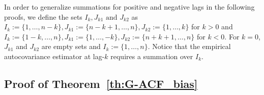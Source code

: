 \documentclass[11pt]{article}
\theoremstyle{remark}
\begin{document}
In order to generalize summations for positive and negative lags in the following proofs, we define the sets $I_k, J_{k1} \text{ and } J_{k2}$ as $ I_k := \{1, \dots, n-k\}, J_{k1} := \{n-k+1, \dots , n\}, J_{k2} := \{1, \dots, k\}$ for $k > 0$ and  $I_k := \{1-k, \dots, n\}, J_{k1} := \{1, \dots , -k\}, J_{k2} := \{n+k+1, \dots, n\}$ for $k < 0$. For $k=0$, $J_{k1}$ and $J_{k2}$ are empty sets and $I_k := \{1, \dots, n\}$. Notice that the empirical autocovariance estimator at lag-$k$ requires a summation over $I_k$. 

\subsection{Proof of Theorem~\ref{th:G-ACF_bias}} 
\label{appendix:bias}

\end{document}
